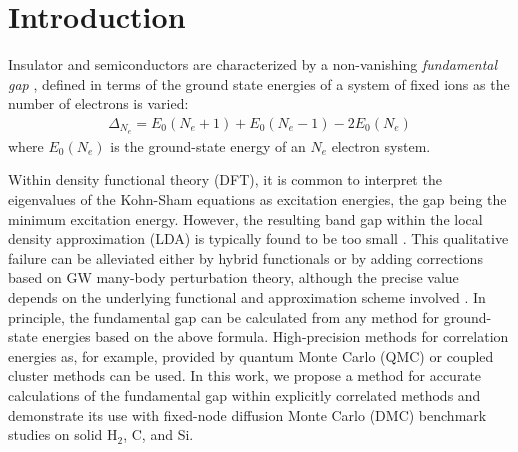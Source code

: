 \newcommand \beq{\begin{eqnarray}}
\newcommand \eeq{\end{eqnarray}}
\newcommand \bea{\begin{eqnarray}}
\newcommand \eea{\end{eqnarray}}
\newcommand \avec{{\bf a}}
\newcommand \kvec{{\bf k}}
\newcommand \lvec{{\bf l}}
\newcommand \qvec{{\bf q}}
\newcommand \pvec{{\bf p}}
\newcommand \hvec{{\bf h}}
\newcommand \nvec{{\bf n}}
\newcommand \xvec{{\bf x}}
\newcommand\rvec{{\bf r}}
\newcommand\yvec{{\bf y}}
\newcommand\Rvec{{\bf R}}
\newcommand\Pvec{{\bf P}}
\newcommand\Qvec{{\bf Q}}
\newcommand\Gvec{{\bf G}}
\newcommand\Kvec{{\bf K}}
\def\simge{\mathrel{%
       \rlap{\raise 0.511ex \hbox{$>$}}{\lower 0.511ex \hbox{$\sim$}}}}
\def\simle{\mathrel{
       \rlap{\raise 0.511ex \hbox{$<$}}{\lower 0.511ex \hbox{$\sim$}}}}

\section{Introduction}
Insulator and semiconductors are characterized by a non-vanishing {\it fundamental gap}
\cite{book}, 
defined in terms of the ground state energies of a system of fixed ions as the number of electrons is varied:
\beq
\Delta_{N_e} = E_0(N_e+1)+ E_0(N_e-1)- 2 E_0(N_e)
\label{gap}
\eeq
where $E_0(N_e)$ is the ground-state energy of an $N_e$ electron system.

Within density functional theory (DFT), it is common to interpret the eigenvalues of the
Kohn-Sham equations as excitation energies, the gap being the minimum excitation energy. However, the resulting band gap
within the local density approximation (LDA) is typically found to be too small \cite{Perdew}.
This qualitative failure can be alleviated
either by hybrid functionals or by adding corrections based on GW many-body perturbation theory,
although the precise value depends on the underlying functional and approximation scheme involved \cite{book}.
In principle, the fundamental gap can be calculated from any method for ground-state energies
based on the above formula.
High-precision methods for correlation energies as, for example, provided
by quantum Monte Carlo (QMC) \cite{rev1,rev2,rev3,Ruggeri18} or coupled cluster methods
\cite{Shepherd13,Gruber18} can be used.  
In this work, we propose a method for accurate calculations of the fundamental gap
within explicitly correlated methods and demonstrate its use with fixed-node diffusion Monte Carlo (DMC) benchmark studies on solid H$_2$,  C, and Si.


